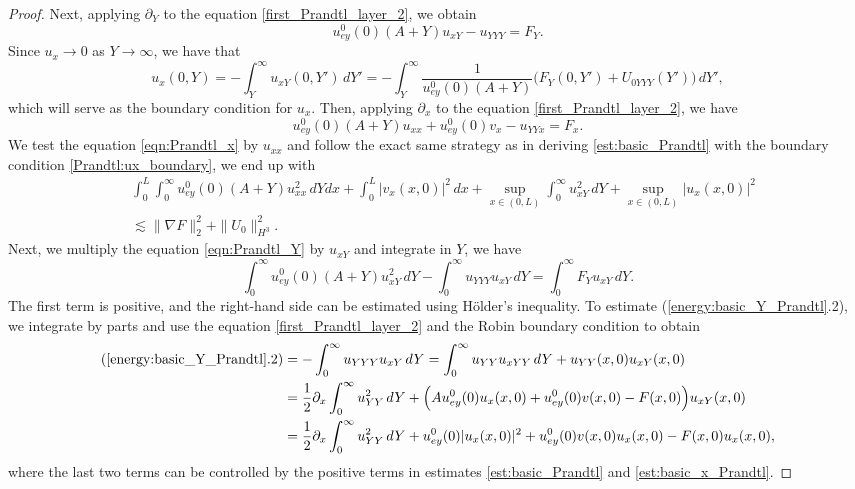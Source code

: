 \documentclass[reqno, 11pt]{amsart}
\theoremstyle{plain}
\theoremstyle{definition}
\theoremstyle{remark}
\numberwithin{equation}{section}
\begin{document}
\begin{proof}
Next, applying $\partial_Y$ to the equation \eqref{first_Prandtl_layer_2}, we obtain
\begin{equation}\label{eqn:Prandtl_Y}
u_{ey}^0(0) (A+Y) u_{xY} - u_{YYY} = F_Y.
\end{equation}
Since $u_x \to 0$ as $Y \to \infty$, we have that
\begin{equation}\label{Prandtl:ux_boundary}
u_x(0,Y) = - \int_Y^\infty u_{xY}(0,Y') \, dY' = - \int_Y^\infty \frac{1}{u_{ey}^0(0) (A+Y)} \Big( F_Y(0,Y') + U_{0YYY}(Y') \Big) \, dY',
\end{equation}
which will serve as the boundary condition for $u_x$. Then, applying $\partial_x$ to the equation \eqref{first_Prandtl_layer_2}, we have
\begin{equation}\label{eqn:Prandtl_x}
u_{ey}^0(0) (A+Y) u_{xx} + u_{ey}^0(0) v_x - u_{YYx} = F_x.
\end{equation}
We test the equation \eqref{eqn:Prandtl_x} by $u_{xx}$ and follow the exact same strategy as in deriving \eqref{est:basic_Prandtl} with the boundary condition \eqref{Prandtl:ux_boundary}, we end up with
\begin{equation}\label{est:basic_x_Prandtl}
\begin{aligned}
&\int_0^L \int_0^\infty  u_{ey}^0(0) (A+Y) u_{xx}^2 \, dY dx + \int_0^L |v_x(x,0)|^2\, dx + \sup_{x\in(0,L)} \int_0^\infty  u_{xY}^2 \, dY + \sup_{x\in(0,L)} |u_x(x,0)|^2\\
& \lesssim \|\nabla F\|_2^2 + \|U_0\|_{H^3}^2.
\end{aligned}
\end{equation}
Next, we multiply the equation \eqref{eqn:Prandtl_Y} by $u_{xY}$ and integrate in $Y$, we have
\begin{equation}\label{energy:basic_Y_Prandtl}
\int_0^\infty  u_{ey}^0(0) (A+Y) u_{xY}^2 \, dY - \int_0^\infty  u_{YYY} u_{xY} \, dY = \int_0^\infty  F_Y u_{xY} \,dY.
\end{equation}
The first term is positive, and the right-hand side can be estimated using H\"older's inequality. To estimate (\ref{energy:basic_Y_Prandtl}.2), we integrate by parts and use the equation \eqref{first_Prandtl_layer_2} and the Robin boundary condition to obtain
\begin{align*}
(\ref{energy:basic_Y_Prandtl}.2) &= - \int_0^\infty  u_{YYY} u_{xY} \, dY = \int_0^\infty u_{YY} u_{xYY} \, dY + u_{YY}(x,0) u_{xY}(x,0)\\
&= \frac{1}{2} \partial_x \int_0^\infty  u_{YY}^2 \, dY + \Big( A u_{ey}^0(0) u_x(x,0) + u_{ey}^0(0) v(x,0) - F(x,0)   \Big) u_{xY}(x,0)\\
&= \frac{1}{2} \partial_x \int_0^\infty  u_{YY}^2 \, dY + u_{ey}^0(0) |u_x(x,0)|^2 + u_{ey}^0(0) v(x,0) u_x(x,0)  - F(x,0)  u_x(x,0),
\end{align*}
where the last two terms can be controlled by the positive terms in estimates \eqref{est:basic_Prandtl} and \eqref{est:basic_x_Prandtl}.


\end{proof}
\end{document}
